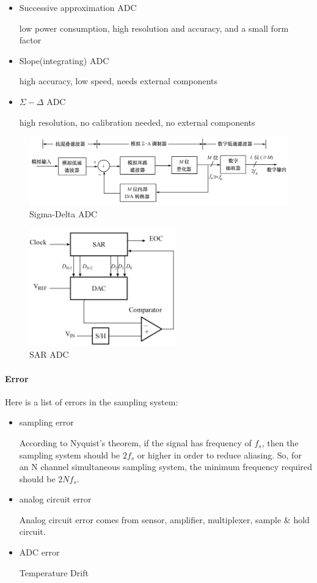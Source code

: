 \begin{itemize}
  \item Successive approximation ADC

  low power consumption, high resolution and accuracy, and a small form factor

  \item Slope(integrating) ADC

  high accuracy, low speed, needs external components

  \item $\Sigma - \Delta$ ADC

  high resolution, no calibration needed, no external components

\end{itemize}

\begin{figure}
  \centering
  \includegraphics[width=4.5in]{fig/sigma_delta_ADC.png}
  \caption{Sigma-Delta ADC}\label{fig_sigma_delta_ADC}
\end{figure}


\begin{figure}
  \centering
  \includegraphics[width=2.5in]{fig/SA_ADC_block_diagram.png}
  \caption{SAR ADC}\label{fig_SAR_ADC}
\end{figure}


\paragraph{Error} Here is a list of errors in the sampling system:
\begin{itemize}
  \item sampling error

  According to Nyquist's theorem, if the signal has frequency of $f_s$, then the sampling system should be $2f_s$ or higher in order to reduce aliasing. So, for an N channel simultaneous sampling system, the minimum frequency required should be $2Nf_s$.

  \item analog circuit error

  Analog circuit error comes from sensor, amplifier, multiplexer, sample \& hold circuit.

  \item ADC error

  Temperature Drift
\end{itemize}

